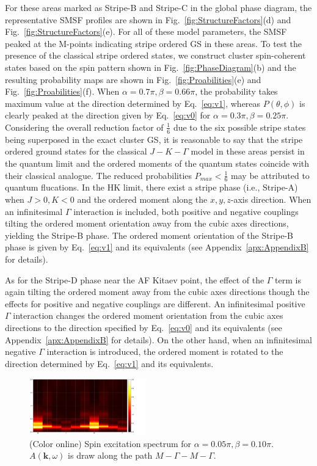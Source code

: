 \documentclass[aps,prb,reprint,amsfonts,amsmath,amssymb,showpacs,groupedaddress,superscriptaddress]{revtex4-1}
\begin{document}
For these areas marked as Stripe-B and Stripe-C in the global phase diagram, the representative SMSF profiles are shown in Fig.~\ref{fig:StructureFactors}(d) and Fig.~\ref{fig:StructureFactors}(e). For all of these model parameters, the SMSF peaked at the M-points indicating stripe ordered GS in these areas. To test the presence of the classical stripe ordered states, we construct cluster spin-coherent states based on the spin pattern shown in Fig.~\ref{fig:PhaseDiagram}(b) and the resulting probability maps are shown in Fig.~\ref{fig:Proabilities}(e) and Fig.~\ref{fig:Proabilities}(f). When $\alpha=0.7\pi,\beta=0.66\pi$, the probability takes maximum value at the direction determined by Eq.~\eqref{eq:v1}, whereas $P(\theta, \phi)$ is clearly peaked at the direction given by Eq.~\eqref{eq:v0} for $\alpha=0.3\pi, \beta=0.25\pi$. Considering the overall reduction factor of $\frac{1}{6}$ due to the six possible stripe states being superposed in the exact cluster GS, it is reasonable to say that the stripe ordered ground states for the classical $J-K-\Gamma$ model in these areas persist in the quantum limit and the ordered moments of the quantum states coincide with their classical analogue. The reduced probabilities $P_{max} < \frac{1}{6}$ may be attributed to quantum flucations. In the HK limit, there exist a stripe phase (i.e., Stripe-A) when $J>0, K<0$ and the ordered moment along the $x,y,z$-axis direction. When an infinitesimal $\Gamma$ interaction is included, both positive and negative couplings tilting the ordered moment orientation away from the cubic axes directions, yielding the Stripe-B phase. The ordered moment orientation of the Stripe-B phase is given by Eq.~\eqref{eq:v1} and its equivalents (see Appendix~\ref{apx:AppendixB} for details).

As for the Stripe-D phase near the AF Kitaev point, the effect of the $\Gamma$ term is again tilting the ordered moment away from the cubic axes directions though the effects for positive and negative couplings are different. An infinitesimal positive $\Gamma$ interaction changes the ordered moment orientation from the cubic axes directions to the direction specified by Eq.~\eqref{eq:v0} and its equivalents (see Appendix~\ref{apx:AppendixB} for details). On the other hand, when an infinitesimal negative $\Gamma$ interaction is introduced, the ordered moment is rotated to the direction determined by Eq.~\eqref{eq:v1} and its equivalents.

\begin{figure}
    \includegraphics[width=0.45\textwidth]{Fig5.pdf}
    \caption{\label{fig:Spectrum}(Color online) Spin excitation spectrum for $\alpha=0.05\pi,\beta=0.10\pi$. $A(\bm{k}, \omega)$ is draw along the path $M-\Gamma-M-\Gamma$.}
\end{figure}
\end{document}
